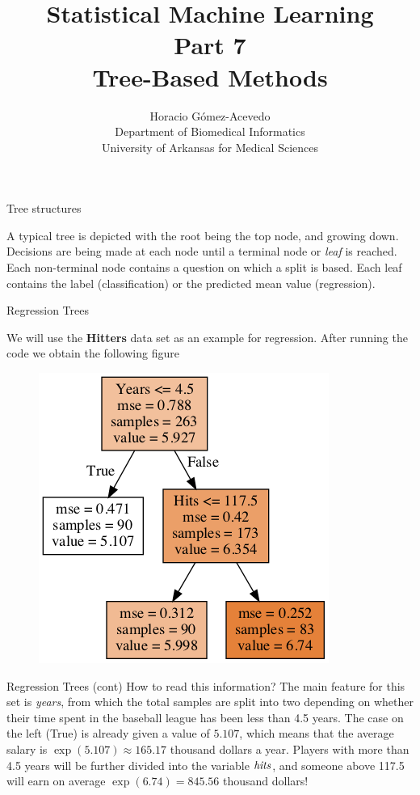 \documentclass{beamer}
\title{Statistical Machine Learning\\ Part 7\\
Tree-Based Methods}
\author{Horacio G\'omez-Acevedo\\ Department of Biomedical Informatics\\
University of Arkansas for Medical Sciences}
\begin{document}
	\begin{frame}[plain]
		\maketitle
	\end{frame}
	
	
	\begin{frame}{Tree structures}
		
		A typical tree is depicted with the root being the top node, and growing down. Decisions are being made at each node until a terminal node or {\it leaf} is reached. Each non-terminal node contains a question on which a split is based. Each leaf contains the label (classification) or the predicted mean value (regression).
		 
		
		
\end{frame}

\begin{frame}{Regression Trees}

We will use the {\bf Hitters} data set as an example for  regression.  After running the code we obtain the following figure

\begin{figure}[h]
	\centering
	\includegraphics[scale=0.5]{../../Figures/fig_hitters.png}
\end{figure}
	
	
\end{frame}

\begin{frame}{Regression Trees (cont)}
	How to read this information?
	The main feature for this set is {\it years}, from which the total samples are split into two depending on whether their time spent in the baseball league has been less than 4.5 years. The case on the left (True) is already given a value of $5.107$, which means that the average salary is $\exp(5.107)\approx 165.17$ thousand dollars a year. Players with more than 4.5 years will be further divided into the variable ${\it hits} $, and someone above 117.5 will earn on average $\exp(6.74)=845.56$ thousand dollars!
\end{frame}
\end{document}
